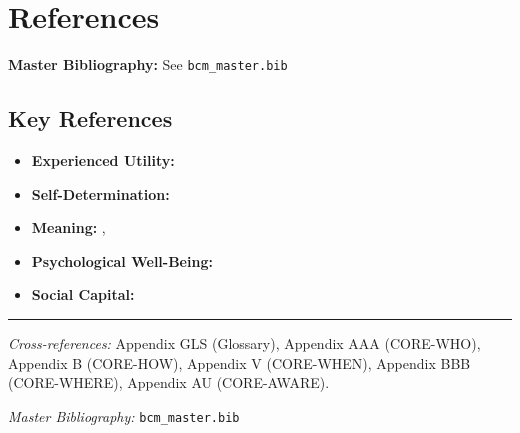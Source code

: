 \section{References}
\label{sec:what-references}

\begin{tcolorbox}[colback=blue!5!white, colframe=blue!75!black]
\textbf{Master Bibliography:} See \texttt{bcm\_master.bib}
\end{tcolorbox}

\subsection{Key References}

\begin{itemize}[nosep]
\item \textbf{Experienced Utility:} \citet{kahneman1999wellbeing}
\item \textbf{Self-Determination:} \citet{ryan2000self}
\item \textbf{Meaning:} \citet{frankl1959search}, \citet{steger2006meaning}
\item \textbf{Psychological Well-Being:} \citet{ryff1989happiness}
\item \textbf{Social Capital:} \citet{putnam2000bowling}
\end{itemize}

\nocite{bcm_master}


\vspace{1em}
\hrule
\vspace{0.5em}

\noindent\textit{Cross-references:}
Appendix GLS (Glossary),
Appendix AAA (CORE-WHO),
Appendix B (CORE-HOW),
Appendix V (CORE-WHEN),
Appendix BBB (CORE-WHERE),
Appendix AU (CORE-AWARE).

\noindent\textit{Master Bibliography:} \texttt{bcm\_master.bib}

